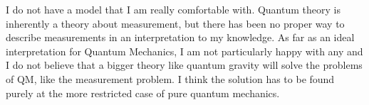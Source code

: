 \documentclass[12pt,a4]{article}
\begin{document}
\begin{enumerate}
\begin{enumerate}
        I do not have a model that I am really comfortable with.
        Quantum theory is inherently a theory about measurement, but there has been no proper way to describe measurements in an interpretation to my knowledge.
        As far as an ideal interpretation for Quantum Mechanics, I am not particularly happy with any and I do not believe that a bigger theory like quantum gravity will solve the problems of QM, like the measurement problem. 
        I think the solution has to be found purely at the more restricted case of pure quantum mechanics.
    \end{enumerate}
\end{enumerate}
\end{document}
